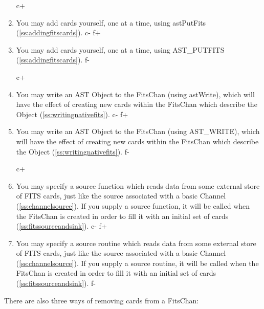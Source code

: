 \documentclass[twoside,11pt]{article}
\newcommand{\secref}[1]{\S\ref{#1}}
\renewcommand{\secref}[1]{\ref{#1}}
\begin{document}
\begin{enumerate}
c+
\item You may add cards yourself, one at a time, using astPutFits
(\secref{ss:addingfitscards}).
c-
f+
\item You may add cards yourself, one at a time, using AST\_PUTFITS
(\secref{ss:addingfitscards}).
f-

c+
\item You may write an AST Object to the FitsChan (using astWrite),
which will have the effect of creating new cards within the FitsChan
which describe the Object (\secref{ss:writingnativefits}).
c-
f+
\item You may write an AST Object to the FitsChan (using AST\_WRITE),
which will have the effect of creating new cards within the FitsChan
which describe the Object (\secref{ss:writingnativefits}).
f-

c+
\item You may specify a source function which reads data from some
external store of FITS cards, just like the source associated with a
basic Channel (\secref{ss:channelsource}). If you supply a source
function, it will be called when the FitsChan is created in order to
fill it with an initial set of cards (\secref{ss:fitssourceandsink}).
c-
f+
\item You may specify a source routine which reads data from some
external store of FITS cards, just like the source associated with a
basic Channel (\secref{ss:channelsource}). If you supply a source
routine, it will be called when the FitsChan is created in order to
fill it with an initial set of cards (\secref{ss:fitssourceandsink}).
f-
\end{enumerate}

There are also three ways of removing cards from a FitsChan:
\end{document}

